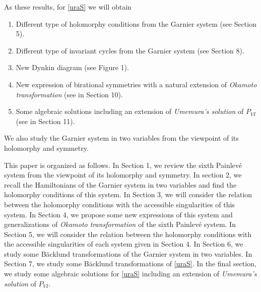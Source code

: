As these results, for \eqref{uraS} we will obtain
\begin{enumerate}
\item Different type of holomorphy conditions from the Garnier system (see Section 5).

\item Different type of invariant cycles from the Garnier system (see Section 8).

\item New Dynkin diagram (see Figure 1).

\item New expression of birational symmetries with a natural extension of {\it Okamoto transformation} (see in Section 10).

\item Some algebraic solutions including an extension of {\it Umemura's solution} of $P_{VI}$ (see in Section 11).
\end{enumerate}
We also study the Garnier system in two variables from the viewpoint of its holomorphy and symmetry.

This paper is organized as follows. In Section 1, we review the sixth Painlev\'e system from the viewpoint of its holomorphy and symmetry. In section 2, we recall the Hamiltonians of the Garnier system in two variables and find the holomorphy conditions of this system. In Section 3, we will consider the relation between the holomorphy conditions with the accessible singularities of this system. In Section 4, we propose some new expressions of this system and generalizations of {\it Okamoto transformation \it}of the sixth Painlev\'e system. In Section 5, we will consider the relation between the holomorphy conditions with the accessible singularities of each system given in Section 4. In Section 6, we study some B{\"a}cklund transformations of the Garnier system in two variables. In Section 7, we study some B{\"a}cklund transformations of \eqref{uraS}. In the final section, we study some algebraic solutions for \eqref{uraS} including an extension of {\it Umemura's solution} of $P_{VI}$.







